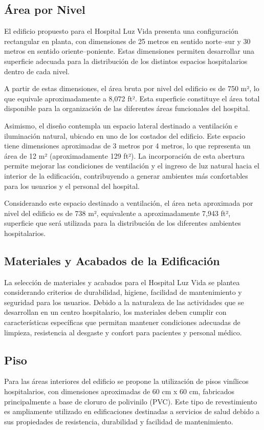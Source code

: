\documentclass[14pt,letterpaper]{extarticle}
\begin{document}
	
	\subsection{Área por Nivel}
	El edificio propuesto para el Hospital Luz Vida presenta una configuración rectangular en planta, con dimensiones de 25 metros en sentido norte–sur y 30 metros en sentido oriente–poniente. Estas dimensiones permiten desarrollar una superficie adecuada para la distribución de los distintos espacios hospitalarios dentro de cada nivel.
	
	A partir de estas dimensiones, el área bruta por nivel del edificio es de 750 m², lo que equivale aproximadamente a 8,072 ft². Esta superficie constituye el área total disponible para la organización de las diferentes áreas funcionales del hospital.
	
	Asimismo, el diseño contempla un espacio lateral destinado a ventilación e iluminación natural, ubicado en uno de los costados del edificio. Este espacio tiene dimensiones aproximadas de 3 metros por 4 metros, lo que representa un área de 12 m² (aproximadamente 129 ft²). La incorporación de esta abertura permite mejorar las condiciones de ventilación y el ingreso de luz natural hacia el interior de la edificación, contribuyendo a generar ambientes más confortables para los usuarios y el personal del hospital.
	
	Considerando este espacio destinado a ventilación, el área neta aproximada por nivel del edificio es de 738 m², equivalente a aproximadamente 7,943 ft², superficie que será utilizada para la distribución de los diferentes ambientes hospitalarios.
	
	\subsection{Materiales y Acabados de la Edificación}
	La selección de materiales y acabados para el Hospital Luz Vida se plantea considerando criterios de durabilidad, higiene, facilidad de mantenimiento y seguridad para los usuarios. Debido a la naturaleza de las actividades que se desarrollan en un centro hospitalario, los materiales deben cumplir con características específicas que permitan mantener condiciones adecuadas de limpieza, resistencia al desgaste y confort para pacientes y personal médico.
	
		\subsection{Piso}
		Para las áreas interiores del edificio se propone la utilización de pisos vinílicos hospitalarios, con dimensiones aproximadas de 60 cm x 60 cm, fabricados principalmente a base de cloruro de polivinilo (PVC). Este tipo de revestimiento es ampliamente utilizado en edificaciones destinadas a servicios de salud debido a sus propiedades de resistencia, durabilidad y facilidad de mantenimiento.
		
\end{document}
